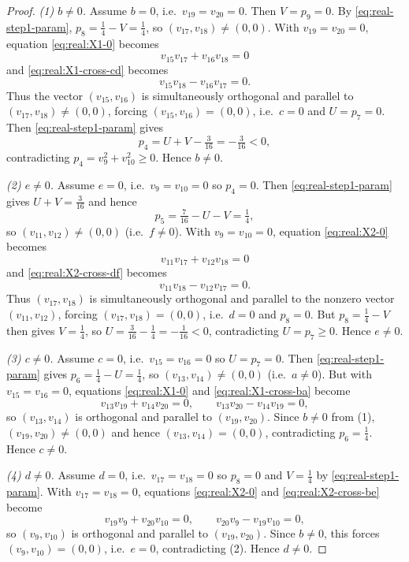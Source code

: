 \documentclass[11pt]{article}
\begin{document}
\begin{proof}
\smallskip
\noindent\emph{(1) $b\neq 0$.}
Assume $b=0$, i.e.\ $v_{19}=v_{20}=0$. Then $V=p_9=0$.
By \eqref{eq:real-step1-param}, $p_8=\tfrac14-V=\tfrac14$, so $(v_{17},v_{18})\neq (0,0)$.
With $v_{19}=v_{20}=0$, equation \eqref{eq:real:X1-0} becomes
\[
v_{15}v_{17}+v_{16}v_{18}=0
\]
and \eqref{eq:real:X1-cross-cd} becomes
\[
v_{15}v_{18}-v_{16}v_{17}=0.
\]
Thus the vector $(v_{15},v_{16})$ is simultaneously orthogonal and parallel to $(v_{17},v_{18})\neq(0,0)$, forcing
$(v_{15},v_{16})=(0,0)$, i.e.\ $c=0$ and $U=p_7=0$.
Then \eqref{eq:real-step1-param} gives
\[
p_4=U+V-\tfrac{3}{16}=-\tfrac{3}{16}<0,
\]
contradicting $p_4=v_9^2+v_{10}^2\ge 0$. Hence $b\neq 0$.

\smallskip
\noindent\emph{(2) $e\neq 0$.}
Assume $e=0$, i.e.\ $v_9=v_{10}=0$ so $p_4=0$.
Then \eqref{eq:real-step1-param} gives $U+V=\tfrac{3}{16}$ and hence
\[
p_5=\tfrac{7}{16}-U-V=\tfrac14,
\]
so $(v_{11},v_{12})\neq (0,0)$ (i.e.\ $f\neq 0$).
With $v_9=v_{10}=0$, equation \eqref{eq:real:X2-0} becomes
\[
v_{11}v_{17}+v_{12}v_{18}=0
\]
and \eqref{eq:real:X2-cross-df} becomes
\[
v_{11}v_{18}-v_{12}v_{17}=0.
\]
Thus $(v_{17},v_{18})$ is simultaneously orthogonal and parallel to the nonzero vector $(v_{11},v_{12})$, forcing
$(v_{17},v_{18})=(0,0)$, i.e.\ $d=0$ and $p_8=0$.
But $p_8=\tfrac14-V$ then gives $V=\tfrac14$, so $U=\tfrac{3}{16}-\tfrac14=-\tfrac{1}{16}<0$,
contradicting $U=p_7\ge 0$. Hence $e\neq 0$.

\smallskip
\noindent\emph{(3) $c\neq 0$.}
Assume $c=0$, i.e.\ $v_{15}=v_{16}=0$ so $U=p_7=0$.
Then \eqref{eq:real-step1-param} gives $p_6=\tfrac14-U=\tfrac14$, so $(v_{13},v_{14})\neq (0,0)$ (i.e.\ $a\neq 0$).
But with $v_{15}=v_{16}=0$, equations \eqref{eq:real:X1-0} and \eqref{eq:real:X1-cross-ba} become
\[
v_{13}v_{19}+v_{14}v_{20}=0,\qquad
v_{13}v_{20}-v_{14}v_{19}=0,
\]
so $(v_{13},v_{14})$ is orthogonal and parallel to $(v_{19},v_{20})$.
Since $b\neq 0$ from (1), $(v_{19},v_{20})\neq (0,0)$ and hence $(v_{13},v_{14})=(0,0)$,
contradicting $p_6=\tfrac14$. Hence $c\neq 0$.

\smallskip
\noindent\emph{(4) $d\neq 0$.}
Assume $d=0$, i.e.\ $v_{17}=v_{18}=0$ so $p_8=0$ and $V=\tfrac14$ by \eqref{eq:real-step1-param}.
With $v_{17}=v_{18}=0$, equations \eqref{eq:real:X2-0} and \eqref{eq:real:X2-cross-be} become
\[
v_{19}v_{9}+v_{20}v_{10}=0,\qquad
v_{20}v_{9}-v_{19}v_{10}=0,
\]
so $(v_9,v_{10})$ is orthogonal and parallel to $(v_{19},v_{20})$.
Since $b\neq 0$, this forces $(v_9,v_{10})=(0,0)$, i.e.\ $e=0$, contradicting (2).
Hence $d\neq 0$.


\end{proof}
\end{document}
